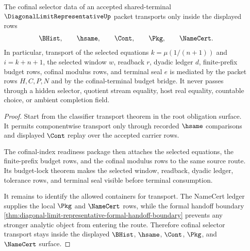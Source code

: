 \begin{theorem}
\label{thm:diagonal-limit-representative-cofinal-selector-transport}
The cofinal selector data of an accepted shared-terminal $\DiagonalLimitRepresentativeUp$ packet transports only inside the displayed rows
$$
\BHist,\qquad \hsame,\qquad \Cont,\qquad \Pkg,\qquad \NameCert.
$$
In particular, transport of the selected equations $k=\mu(1/(n+1))$ and $i=k+n+1$, the selected window $w$, readback $r$, dyadic ledger $d$, finite-prefix budget rows, cofinal modulus rows, and terminal seal $e$ is mediated by the packet rows $H,C,P,N$ and by the cofinal-terminal budget bridge. It never passes through a hidden selector, quotient stream equality, host real equality, countable choice, or ambient completion field.
\end{theorem}
\begin{proof}
Start from the classifier transport theorem in the root obligation surface. It permits componentwise transport only through recorded $\hsame$ comparisons and displayed $\Cont$ replay over the accepted carrier rows.

The cofinal-index readiness package then attaches the selected equations, the finite-prefix budget rows, and the cofinal modulus rows to the same source route. Its budget-lock theorem makes the selected window, readback, dyadic ledger, tolerance rows, and terminal seal visible before terminal consumption.

It remains to identify the allowed containers for transport. The NameCert ledger supplies the local $\Pkg$ and $\NameCert$ rows, while the formal handoff boundary \autoref{thm:diagonal-limit-representative-formal-handoff-boundary} prevents any stronger analytic object from entering the route. Therefore cofinal selector transport stays inside the displayed $\BHist$, $\hsame$, $\Cont$, $\Pkg$, and $\NameCert$ surface.
\end{proof}

